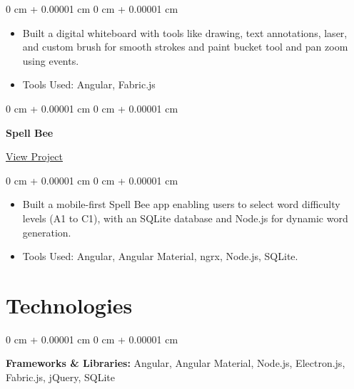 \documentclass[10pt, letterpaper]{article}
\newenvironment{highlights}{
    \begin{itemize}[
        topsep=0.10 cm,
        parsep=0.10 cm,
        partopsep=0pt,
        itemsep=0pt,
        leftmargin=0 cm + 10pt
    ]
}{
    \end{itemize}
} %
\newenvironment{onecolentry}{
    \begin{adjustwidth}{
        0 cm + 0.00001 cm
    }{
        0 cm + 0.00001 cm
    }
}{
    \end{adjustwidth}
} %
\newenvironment{twocolentry}[2][]{
    \onecolentry
    \def\secondColumn{#2}
    \setcolumnwidth{\fill, 4.5 cm}
    \begin{paracol}{2}
}{
    \switchcolumn \raggedleft \secondColumn
    \end{paracol}
    \endonecolentry
} %
\begin{document}
				\vspace{0.10 cm}
				\begin{onecolentry}
					\begin{highlights}
						\item Built a digital whiteboard with tools like drawing, text annotations, laser, and custom brush for smooth strokes and paint bucket tool and pan zoom using events.
						\item Tools Used: Angular, Fabric.js
					\end{highlights}
				\end{onecolentry}
				\vspace{0.2 cm}
				\begin{twocolentry}{
						\href{https://vijay18399.github.io}{View Project}
					}
					\textbf{Spell Bee}
				\end{twocolentry}
				\vspace{0.10 cm}
				\begin{onecolentry}
					\begin{highlights}
						\item Built a mobile-first Spell Bee app enabling users to select word difficulty levels (A1 to C1), with an SQLite database and Node.js for dynamic word generation.
						\item Tools Used: Angular, Angular Material, ngrx, Node.js, SQLite.
					\end{highlights}
				\end{onecolentry}
				\section{Technologies}
				\begin{onecolentry}
					\textbf{Frameworks \& Libraries:}  Angular, Angular Material, Node.js, Electron.js, Fabric.js, jQuery, SQLite
				\end{onecolentry}
\end{document}
